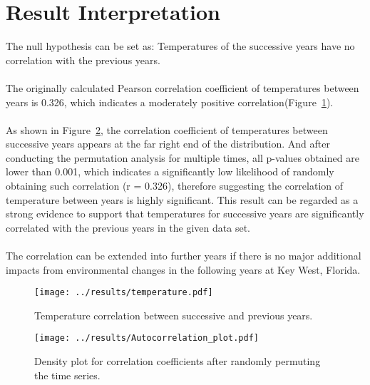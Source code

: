 \documentclass{article}
\begin{document}
\section*{Result Interpretation}
The null hypothesis can be set as: Temperatures of the successive years have no correlation with the previous years. 
\\
\\The originally calculated Pearson correlation coefficient of temperatures between years is 0.326, which indicates a moderately positive correlation(Figure~\ref{fig:temperature}).
\\
\\As shown in Figure~\ref{fig:Autocorrelation}, the correlation coefficient of temperatures between successive years appears at the far right end of the distribution. And after conducting the permutation analysis for multiple times, all p-values obtained are lower than 0.001, which indicates a significantly low likelihood of randomly obtaining such correlation (r = 0.326), therefore suggesting the correlation of temperature between years is highly significant. This result can be regarded as a strong evidence to support that temperatures for successive years are significantly correlated with the previous years in the given data set.
\\
\\The correlation can be extended into further years if there is no major additional impacts from environmental changes in the following years at Key West, Florida. 
\begin{figure}[h!]
    \centering
    \texttt{[image: ../results/temperature.pdf]}
    \caption{Temperature correlation between successive and previous years.}
    \label{fig:temperature}
\end{figure}

\begin{figure}[h!]
    \centering
    \texttt{[image: ../results/Autocorrelation\_plot.pdf]}
    \caption{Density plot for correlation coefficients after randomly permuting the time series.}
    \label{fig:Autocorrelation}
\end{figure}




\end{document}
